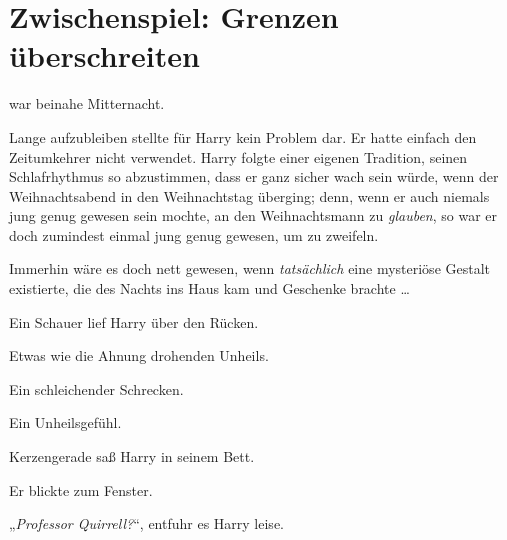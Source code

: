 \chapter{Zwischenspiel: Grenzen überschreiten}

 war beinahe Mitternacht.

\hplettrineextrapara
Lange aufzubleiben stellte für Harry kein Problem dar. Er hatte einfach den Zeitumkehrer nicht verwendet. Harry folgte einer eigenen Tradition, seinen Schlafrhythmus so abzustimmen, dass er ganz sicher wach sein würde, wenn der Weihnachtsabend in den Weihnachtstag überging; denn, wenn er auch niemals jung genug gewesen sein mochte, an den Weihnachtsmann zu \emph{glauben}, so war er doch zumindest einmal jung genug gewesen, um zu zweifeln.

Immerhin wäre es doch nett gewesen, wenn \emph{tatsächlich} eine mysteriöse Gestalt existierte, die des Nachts ins Haus kam und Geschenke brachte …

Ein Schauer lief Harry über den Rücken.

Etwas wie die Ahnung drohenden Unheils.

Ein schleichender Schrecken.

Ein Unheilsgefühl.

Kerzengerade saß Harry in seinem Bett.

Er blickte zum Fenster.

„\emph{Professor Quirrell?}“, entfuhr es Harry leise.

